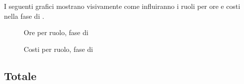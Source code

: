 I seguenti grafici mostrano visivamente come influiranno i ruoli per ore e costi nella fase di \VV.
\begin{figure}[H]
	\centering
	\caption{Ore per ruolo, fase di \VV}
\end{figure}
\begin{figure}[H]
	\centering
	\caption{Costi per ruolo, fase di \VV}
\end{figure}

\subsection{Totale}
